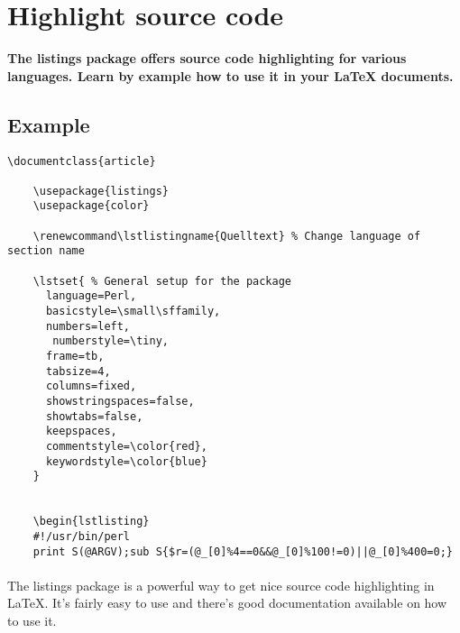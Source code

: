 
\maketitle
\newpage
\section{Highlight source code}
  \textbf{
    The listings package offers source code highlighting for various languages. Learn by example how to use it in your LaTeX documents. 
  }

  \subsection{Example}

  \begin{lstlisting}[language={[LaTeX]TeX},breaklines=true,frame=single]
    \documentclass{article}

    \usepackage{listings}
    \usepackage{color}
    
    \renewcommand\lstlistingname{Quelltext} % Change language of section name
    
    \lstset{ % General setup for the package
      language=Perl,
      basicstyle=\small\sffamily,
      numbers=left,
       numberstyle=\tiny,
      frame=tb,
      tabsize=4,
      columns=fixed,
      showstringspaces=false,
      showtabs=false,
      keepspaces,
      commentstyle=\color{red},
      keywordstyle=\color{blue}
    }
    
    
    \begin{lstlisting}
    #!/usr/bin/perl
    print S(@ARGV);sub S{$r=(@_[0]%4==0&&@_[0]%100!=0)||@_[0]%400=0;}
  \end{lstlisting}
  \paragraph{}
  The listings package is a powerful way to get nice source code highlighting in LaTeX. It's fairly easy to use and there's good documentation available on how to use it.
  
